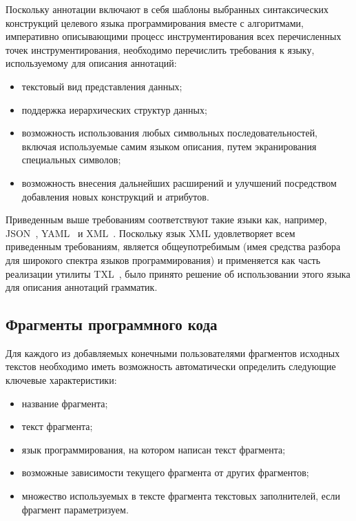 Поскольку аннотации включают в себя
шаблоны выбранных синтаксических конструкций целевого языка программирования вместе с 
алгоритмами, императивно описывающими процесс инструментирования всех перечисленных точек инструментирования,
необходимо перечислить требования к языку, используемому для описания аннотаций:

\begin{itemize}[noitemsep]
  \item текстовый вид представления данных;
  \item поддержка иерархических структур данных;
  \item возможность использования любых символьных последовательностей, включая используемые самим языком описания, путем экранирования специальных символов;
  \item возможность внесения дальнейших расширений и улучшений посредством добавления новых конструкций и атрибутов.
\end{itemize}

Приведенным выше требованиям соответствуют такие языки как, например, JSON~\cite{json}, YAML~\cite{yaml} и XML~\cite{xml}.
Поскольку язык XML удовлетворяет всем приведенным требованиям, является общеупотребимым (имея средства разбора для широкого спектра языков программирования) и применяется как часть реализации утилиты TXL~\cite{txl-freetxl}, было принято решение об использовании этого языка для описания аннотаций грамматик.

\subsection{Фрагменты программного кода}

Для каждого из добавляемых конечными пользователями фрагментов исходных текстов необходимо иметь возможность автоматически определить следующие ключевые характеристики:

\begin{itemize}[noitemsep]
  \item название фрагмента;
  \item текст фрагмента;
  \item язык программирования, на котором написан текст фрагмента;
  \item возможные зависимости текущего фрагмента от других фрагментов;
  \item множество используемых в тексте фрагмента текстовых заполнителей, если фрагмент параметризуем.
\end{itemize}

